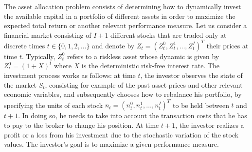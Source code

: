 The asset allocation problem consists of determining how to dynamically invest
the available capital in a portfolio of different assets in order to maximize
the expected total return or another relevant performance measure. Let us
consider a financial market consisting of $I+1$ different stocks that are
traded only at discrete times $t \in \{0, 1, 2, \ldots\}$ and denote by
${Z}_t = {(Z_t^0, Z_t^1, \ldots, Z_t^I)}^T$ their prices at time $t$.
Typically, $Z_t^0$ refers to a riskless asset whose dynamic is given by $Z_t^0
= {(1 + X)}^t$ where $X$ is the deterministic risk-free interest rate. The
investment process works as follows: at time $t$, the investor observes the
state of the market $S_t$, consisting for example of the past asset prices and
other relevant economic variables, and subsequently chooses how to rebalance
his portfolio, by specifying the units of each stock ${n}_t = {(n_t^0 ,
n_t^1 , \ldots , n_t^I)}^T$ to be held between $t$ and $t+1$. In doing so, he
needs to take into account the transaction costs that he has to pay to the
broker to change his position.  At time $t+1$, the investor realizes a profit
or a loss from his investment due to the stochastic variation of the stock
values. The investor’s goal is to maximize a given performance measure.

